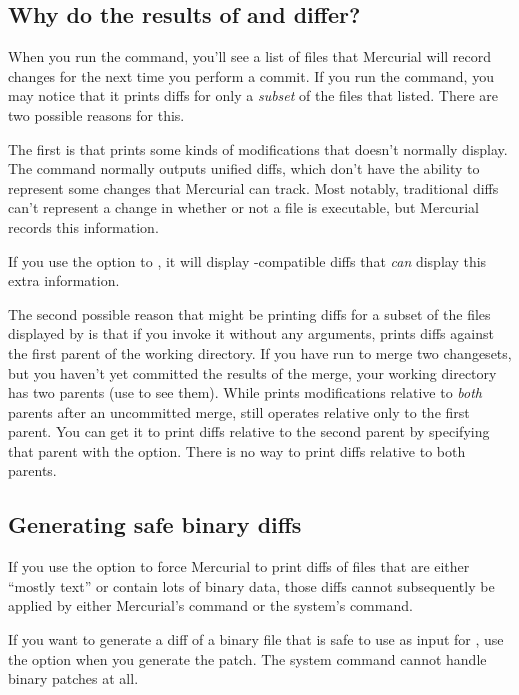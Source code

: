 \subsection{Why do the results of  and 
  differ?}
\label{cmdref:diff-vs-status}

When you run the  command, you'll see a list of files
that Mercurial will record changes for the next time you perform a
commit.  If you run the  command, you may notice that it
prints diffs for only a \emph{subset} of the files that 
listed.  There are two possible reasons for this.

The first is that  prints some kinds of modifications
that  doesn't normally display.  The  command
normally outputs unified diffs, which don't have the ability to
represent some changes that Mercurial can track.  Most notably,
traditional diffs can't represent a change in whether or not a file is
executable, but Mercurial records this information.

If you use the  option to , it will
display -compatible diffs that \emph{can} display this
extra information.

The second possible reason that  might be printing diffs
for a subset of the files displayed by  is that if you
invoke it without any arguments,  prints diffs against the
first parent of the working directory.  If you have run 
to merge two changesets, but you haven't yet committed the results of
the merge, your working directory has two parents (use 
to see them).  While  prints modifications relative to
\emph{both} parents after an uncommitted merge,  still
operates relative only to the first parent.  You can get it to print
diffs relative to the second parent by specifying that parent with the
 option.  There is no way to print diffs relative to
both parents.

\subsection{Generating safe binary diffs}

If you use the  option to force Mercurial to print
diffs of files that are either ``mostly text'' or contain lots of
binary data, those diffs cannot subsequently be applied by either
Mercurial's  command or the system's 
command.  

If you want to generate a diff of a binary file that is safe to use as
input for , use the  option when you
generate the patch.  The system  command cannot handle
binary patches at all.

